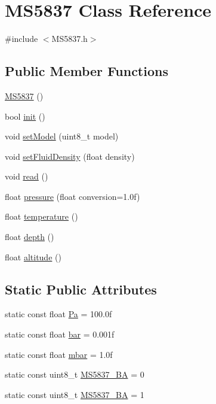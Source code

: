 \hypertarget{classMS5837}{}\section{M\+S5837 Class Reference}
\label{classMS5837}


{\ttfamily \#include $<$M\+S5837.\+h$>$}

\subsection*{Public Member Functions}
\begin{DoxyCompactItemize}
\item 
\hyperlink{classMS5837_af137d8f2b22895a4fe0c3e059d1ba5a3}{M\+S5837} ()
\item 
bool \hyperlink{classMS5837_accd5fa071ae977c796e4fb0648954499}{init} ()
\item 
void \hyperlink{classMS5837_af8b0b1e168f39a9b99fa5918a6ef8f04}{set\+Model} (uint8\+\_\+t model)
\item 
void \hyperlink{classMS5837_a40ad0394fa84d49afa62ae63c411aa8f}{set\+Fluid\+Density} (float density)
\item 
void \hyperlink{classMS5837_a69b945b55b93c96173e8369fec1d9100}{read} ()
\item 
float \hyperlink{classMS5837_a14b4dd5598dc65e2d3f7c185e940af88}{pressure} (float conversion=1.\+0f)
\item 
float \hyperlink{classMS5837_a554d181ffc4329c1e292ca87e0a810f0}{temperature} ()
\item 
float \hyperlink{classMS5837_af5ec680e29a8cdaed429b9fb91d813e6}{depth} ()
\item 
float \hyperlink{classMS5837_af3c24ba068ed52a2918c784b3d608c8a}{altitude} ()
\end{DoxyCompactItemize}
\subsection*{Static Public Attributes}
\begin{DoxyCompactItemize}
\item 
static const float \hyperlink{classMS5837_ae54d04a637682f68502e79d221bf00e3}{Pa} = 100.\+0f
\item 
static const float \hyperlink{classMS5837_afaf021ab4e8b402a642c383f35ff4258}{bar} = 0.\+001f
\item 
static const float \hyperlink{classMS5837_a300724fab62674ab5e32a8b1861d3bba}{mbar} = 1.\+0f
\item 
static const uint8\+\_\+t \hyperlink{classMS5837_abc4a4367230b5ee53fbaf8060231a4bb}{M\+S5837\+\_\+BA} = 0
\item 
static const uint8\+\_\+t \hyperlink{classMS5837_a5b94f94735c695d94882f689fc55e853}{M\+S5837\+\_\+BA} = 1
\end{DoxyCompactItemize}
